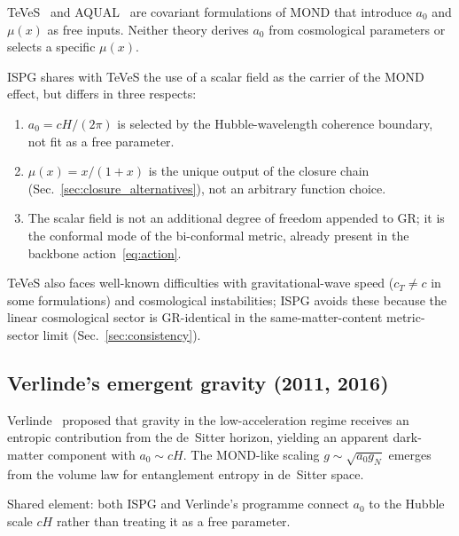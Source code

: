 \documentclass[11pt]{article}
\begin{document}
TeVeS~\cite{Bekenstein2004} and AQUAL~\cite{BekensteinMilgrom1984}
are covariant formulations of MOND that introduce $a_0$ and
$\mu(x)$ as free inputs.  Neither theory derives $a_0$ from
cosmological parameters or selects a specific $\mu(x)$.

ISPG shares with TeVeS the use of a scalar field as the carrier of
the MOND effect, but differs in three respects:
\begin{enumerate}
  \item $a_0=cH/(2\pi)$ is selected by the Hubble-wavelength coherence boundary, not fit as a free parameter.
  \item $\mu(x)=x/(1+x)$ is the unique output of the closure chain
    (Sec.~\ref{sec:closure_alternatives}), not an arbitrary function
    choice.
  \item The scalar field is not an additional degree of freedom
    appended to GR; it is the conformal mode of the bi-conformal
    metric, already present in the backbone action~\eqref{eq:action}.
\end{enumerate}
TeVeS also faces well-known difficulties with gravitational-wave
speed ($c_T\neq c$ in some formulations) and cosmological
instabilities; ISPG avoids these because the linear cosmological
sector is GR-identical in the same-matter-content metric-sector
limit (Sec.~\ref{sec:consistency}).

\subsection{Verlinde's emergent gravity (2011, 2016)}

Verlinde~\cite{Verlinde2011,Verlinde2017} proposed that gravity in
the low-acceleration regime receives an entropic contribution from
the de~Sitter horizon, yielding an apparent dark-matter component
with $a_0\sim cH$.  The MOND-like scaling $g\sim\sqrt{a_0 g_N}$
emerges from the volume law for entanglement entropy in de~Sitter
space.

Shared element: both ISPG and Verlinde's programme connect $a_0$ to
the Hubble scale $cH$ rather than treating it as a free parameter.
\end{document}
